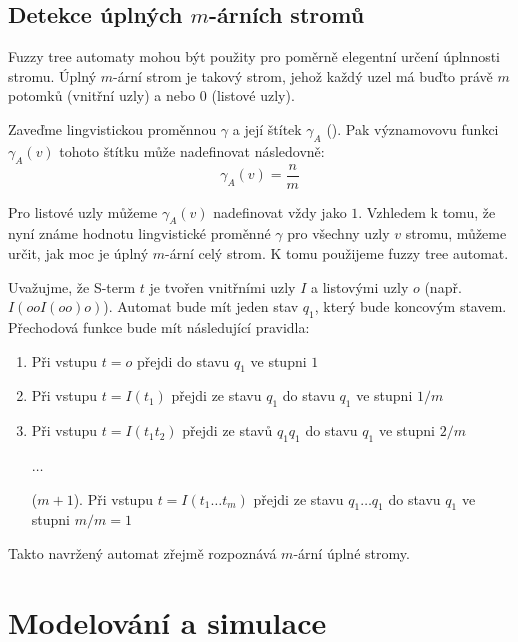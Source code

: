 \subsection{Detekce úplných $m$-árních stromů} \label{subs:DetComTrees}
Fuzzy tree automaty mohou být použity pro poměrně elegentní určení úplnnosti stromu. Úplný $m$-ární strom je takový strom, jehož každý uzel má buďto právě $m$ potomků (vnitřní uzly) a nebo $0$ (listové uzly).

Zaveďme lingvistickou proměnnou $\gamma$  a její štítek $\gamma_A$ (). Pak významovovu funkci $\gamma_A(v)$  tohoto štítku může nadefinovat následovně:
$$
  \gamma_A(v) = \frac{n}{m}
$$

Pro listové uzly můžeme $\gamma_A(v)$ nadefinovat vždy jako $1$. Vzhledem k tomu, že nyní známe hodnotu lingvistické proměnné $\gamma$ pro všechny uzly $v$ stromu, můžeme určit, jak moc je úplný $m$-ární celý strom. K tomu použijeme fuzzy tree automat.

Uvažujme, že S-term $t$ je tvořen vnitřními uzly $I$ a listovými uzly $o$ (např. $I(ooI(oo)o)$). Automat bude mít jeden stav $q_1$, který bude koncovým stavem. Přechodová funkce bude mít následující pravidla:
\begin{enumerate}
 \item Při vstupu $t = o$ přejdi do stavu $q_1$ ve stupni $1$
 \item Při vstupu $t = I(t_1)$ přejdi ze stavu $q_1$ do stavu $q_1$ ve stupni $1/m$
 \item Při vstupu $t = I(t_1 t_2)$ přejdi ze stavů $q_1 q_1$ do stavu $q_1$ ve stupni $2/m$
 \item[] $\dots$
 \item[($m + 1$).] Při vstupu $t = I(t_1 \dots t_m)$ přejdi ze stavu $q_1 \dots q_1$ do stavu $q_1$ ve stupni $m/m = 1$
\end{enumerate}

Takto navržený automat zřejmě rozpoznává $m$-ární úplné stromy.

\section{Modelování a simulace}

